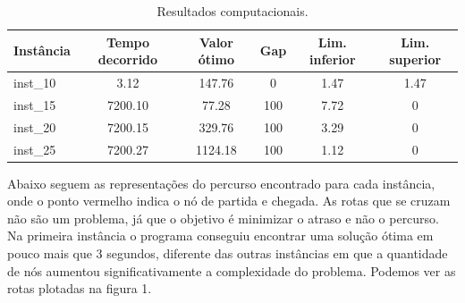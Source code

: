 \documentclass[12pt]{article}
\begin{document}

\begin{table}[h!]
  \begin{center}
    \caption{Resultados computacionais.}
    \label{tab:table1}
    \begin{tabular}{l|c|c|c|c|c} %
      \textbf{Instância} & \textbf{Tempo decorrido} & \textbf{Valor ótimo} & \textbf{Gap} & \textbf{Lim. inferior} & \textbf{Lim. superior} \\
      \hline
      inst\_10           & 3.12                     & 147.76               & 0            & 1.47                   & 1.47                   \\
      \hline
      inst\_15           & 7200.10                  & 77.28                & 100          & 7.72                   & 0                      \\
      \hline
      inst\_20           & 7200.15                  & 329.76               & 100          & 3.29                   & 0                      \\
      \hline
      inst\_25           & 7200.27                  & 1124.18              & 100          & 1.12                   & 0                      \\
      \hline
    \end{tabular}
  \end{center}
\end{table}



Abaixo seguem as representações do percurso encontrado para cada instância, onde o ponto vermelho indica o nó de partida e chegada. As rotas que se cruzam não são um problema, já que o objetivo é minimizar o atraso e não o percurso.
\linebreak
Na primeira instância o programa conseguiu encontrar uma solução ótima em pouco mais que 3 segundos, diferente das outras instâncias em que a quantidade de nós aumentou significativamente a complexidade do problema. Podemos ver as rotas plotadas na figura 1.
\end{document}
